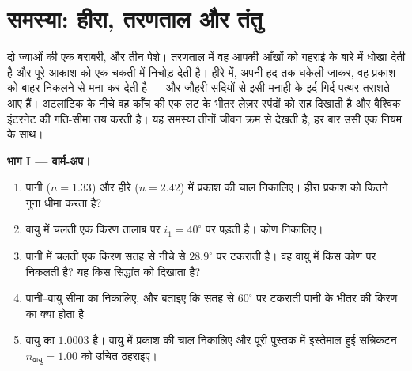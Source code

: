 \section{समस्या: हीरा, तरणताल और तंतु}

\begin{problem}
\label{pb:g10:refraction:1}
दो ज्याओं की एक बराबरी, और तीन पेशे। तरणताल में वह आपकी आँखों को गहराई
के बारे में धोखा देती है और पूरे आकाश को एक चकती में निचोड़ देती है।
हीरे में, अपनी हद तक धकेली जाकर, वह प्रकाश को बाहर निकलने से मना कर देती
है --- और जौहरी सदियों से इसी मनाही के इर्द-गिर्द पत्थर तराशते आए हैं।
अटलांटिक के नीचे वह काँच की एक लट के भीतर लेज़र स्पंदों को राह दिखाती है
और वैश्विक इंटरनेट की गति-सीमा तय करती है। यह समस्या तीनों जीवन क्रम से
देखती है, हर बार उसी एक नियम के साथ।

\medskip
\noindent\textbf{भाग I --- वार्म-अप।}
\begin{enumerate}
  \item पानी ($n = 1.33$) और हीरे ($n = 2.42$) में प्रकाश की चाल निकालिए।
        हीरा प्रकाश को कितने गुना धीमा करता है?
  \item वायु में चलती एक किरण तालाब पर $i_1 = 40^\circ$ पर पड़ती है।
         कोण निकालिए।
  \item पानी में चलती एक किरण सतह से नीचे से $28.9^\circ$ पर टकराती है। वह
        वायु में किस कोण पर निकलती है? यह किस सिद्धांत को दिखाता है?
  \item पानी--वायु सीमा का  निकालिए, और बताइए कि
        सतह से $60^\circ$ पर टकराती पानी के भीतर की किरण का क्या होता है।
  \item वायु का  $1.0003$ है। वायु में प्रकाश की चाल निकालिए
        और पूरी पुस्तक में इस्तेमाल हुई सन्निकटन $n_{\text{वायु}} = 1.00$ को उचित
        ठहराइए।
\end{enumerate}


\end{problem}
